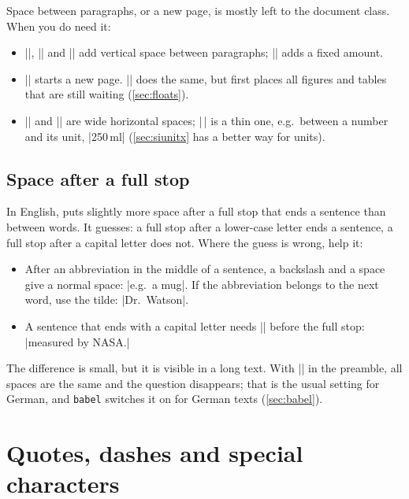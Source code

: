 Space between paragraphs, or a new page, is mostly left to the document class.
When you do need it:

\begin{itemize}
    \item \code|\smallskip|, \code|\medskip| and \code|\bigskip| add vertical space between paragraphs;
        \code|\vspace{1cm}| adds a fixed amount.
    \item \code|\newpage| starts a new page.
        \code|\clearpage| does the same, but first places all figures and tables that are still waiting (\autoref{sec:floats}).
    \item \code|\quad| and \code|\qquad| are wide horizontal spaces;
        \code|\,| is a thin one, e.g.\ between a number and its unit, \code|250\,ml| (\autoref{sec:siunitx} has a better way for units).
\end{itemize}

\subsection{Space after a full stop}

In English,  puts slightly more space after a full stop that ends a sentence than between words.
It guesses: a full stop after a lower-case letter ends a sentence, a full stop after a capital letter does not.
Where the guess is wrong, help it:

\begin{itemize}
    \item After an abbreviation in the middle of a sentence, a backslash and a space give a normal space:
        \code|e.g.\ a mug|.
        If the abbreviation belongs to the next word, use the tilde: \code|Dr.~Watson|.
    \item A sentence that ends with a capital letter needs \code|\@| before the full stop:
        \code|measured by NASA\@.|
\end{itemize}

The difference is small, but it is visible in a long text.
With \code|\frenchspacing| in the preamble, all spaces are the same and the question disappears;
that is the usual setting for German, and \texttt{babel} switches it on for German texts (\autoref{sec:babel}).

\section{Quotes, dashes and special characters}\label{sec:special-chars}

